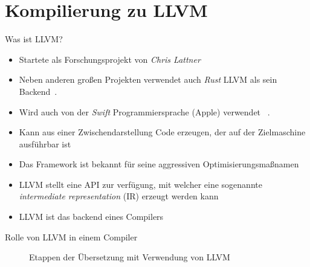\section{Kompilierung zu LLVM}
\begin{frame}{Was ist LLVM?}
    \begin{itemize}
        \item Startete als Forschungsprojekt von \emph{Chris Lattner}~
        \item Neben anderen großen Projekten verwendet auch \emph{Rust} LLVM als sein Backend~.
        \item Wird auch von der \emph{Swift} Programmiersprache (Apple) verwendet ~.
        \item Kann aus einer Zwischendarstellung Code erzeugen, der auf der Zielmaschine ausführbar ist
        \item Das Framework ist bekannt für seine aggressiven Optimisierungsmaßnamen
        \item LLVM stellt eine API zur verfügung, mit welcher eine sogenannte \emph{intermediate representation} (IR) erzeugt werden kann~
        \item[\Rightarrow] LLVM ist das backend eines Compilers
    \end{itemize}
\end{frame}

\begin{frame}{Rolle von LLVM in einem Compiler}
    \begin{figure}[h]
		\begin{adjustbox}{max totalsize={\textwidth}{!},center}
        \end{adjustbox}
        \caption{Etappen der Übersetzung mit Verwendung von LLVM}\label{fig:compilation_steps_llvm}
    \end{figure}
\end{frame}
